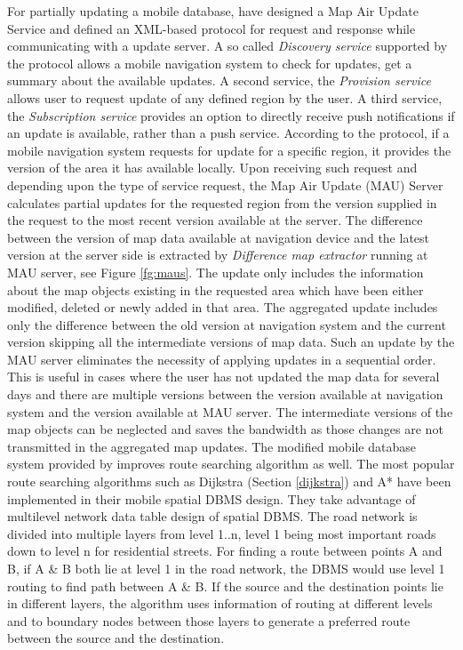 For partially updating a mobile database, \citet{min2011system} have designed a Map Air Update Service and defined an XML-based protocol for request and response while communicating with a update server. A so called \textit{Discovery service} supported by the protocol allows a mobile navigation system to check for updates, get a summary about the available updates. A second service, the \textit{Provision service} allows user to request update of any defined region by the user. A third service, the \textit{Subscription service} provides an option to directly receive push notifications if an update is available, rather than a push service. According to the protocol, if a mobile navigation system requests for update for a specific region, it provides the version of the area it has available locally. Upon receiving such request and depending upon the type of service request, the Map Air Update (MAU) Server calculates partial updates for the requested region from the version supplied in the request to the most recent version available at the server. The difference between the version of map data available at navigation device and the latest version at the server side is extracted by \textit{Difference map extractor} running at MAU server, see Figure \ref{fg:maus}. The update only includes the information about the map objects existing in the requested area which have been either modified, deleted or newly added in that area. The aggregated update includes only the difference between the old version at navigation system and the current version skipping all the intermediate versions of map data. Such an update by the MAU server eliminates the necessity of applying updates in a sequential order. This is useful in cases where the user has not updated the map data for several days and there are multiple versions between the version available at navigation system and the version available at MAU server. The intermediate versions of the map objects can be neglected and saves the bandwidth as those changes are not transmitted in the aggregated map updates. The modified mobile database system provided by \citet{min2011system} improves route searching algorithm as well. The most popular route searching algorithms such as Dijkstra (Section \ref{dijkstra}) and A* have been implemented in their mobile spatial DBMS design. They take advantage of multilevel network data table design of spatial DBMS. The road network is divided into multiple layers from level 1..n, level 1 being most important roads down to level n for residential streets. For finding a route between points A and B, if A \& B both lie at level 1 in the road network, the DBMS would use level 1 routing to find path between A \& B. If the source and the destination points lie in different layers, the algorithm uses information of routing at different levels and to boundary nodes between those layers to generate a preferred route between the source and the destination.



